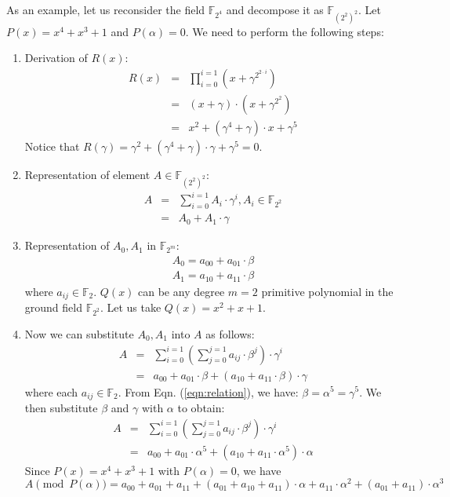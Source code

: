 \begin{Example}
As an example, let us reconsider the field $\mathbb{F}_{2^4}$ and decompose it
as $\mathbb{F}_{(2^2)^2}$. Let $P(x) = x^4 + x^3 + 1$ and $P(\alpha)=0$. We
need to perform the following steps:

\begin{enumerate}
\item 
Derivation of $R(x)$:
\begin{eqnarray}
R(x)&=&\prod_{i=0}^{i=1}(x+\gamma^{2^{2 \cdot i}}) \nonumber \\
&=&(x+\gamma)\cdot (x+\gamma^{2^2})               \nonumber \\
&=&x^2+(\gamma^4+\gamma) \cdot x+\gamma^5          
\end{eqnarray}
Notice that $R(\gamma) = \gamma^2 + (\gamma^4+\gamma) \cdot \gamma+\gamma^5 =0$.
\item 
Representation of element $A \in \mathbb{F}_{(2^2)^2}$:
\begin{eqnarray}
A& = & \sum_{i=0}^{i=1}A_i \cdot \gamma^i, A_i \in \mathbb{F}_{2^2}\nonumber \\
 & = & A_0 +A_1 \cdot \gamma
\end{eqnarray}
\item 
Representation of $A_0, A_1$ in $\mathbb{F}_{2^m}$:
\begin{eqnarray}
A_0=a_{00}+a_{01} \cdot \beta \nonumber \\
A_1=a_{10}+a_{11} \cdot \beta
\end{eqnarray}
where $a_{ij}\in \mathbb{F}_2$. $Q(x)$ can be any degree $m=2$ primitive
polynomial in the ground field  $\mathbb{F}_{2^2}$. Let us take $Q(x)=x^2+x+1$. 

\item Now we can substitute $A_0, A_1$ into $A$ as follows:
\begin{eqnarray}
A&=&\sum_{i=0}^{i=1}(\sum_{j=0}^{j=1}a_{ij} \cdot \beta^j) \cdot \gamma^i \nonumber \\
&=&a_{00}+a_{01}\cdot \beta+(a_{10}+a_{11}\cdot \beta)\cdot \gamma   \end{eqnarray}
where each $a_{ij} \in \mathbb{F}_2$. From Eqn. (\ref{eqn:relation}), we
have: $\beta=\alpha^5=\gamma^5$. We then substitute $\beta$ and
$\gamma$ with $\alpha$ to obtain:
\begin{eqnarray}
A&=&\sum_{i=0}^{i=1}(\sum_{j=0}^{j=1}a_{ij} \cdot \beta^j) \cdot \gamma^i \nonumber \\
&=&a_{00}+a_{01}\cdot \alpha^5+(a_{10}+a_{11}\cdot \alpha^5)\cdot \alpha \nonumber 
\end{eqnarray} 
Since $P(x)=x^4+x^3+1$ with $P(\alpha)=0$, we have
\begin{equation}\label{a}
A \pmod {P(\alpha)}=a_{00}+a_{01}+a_{11}+(a_{01}+a_{10}+a_{11})\cdot \alpha+a_{1
1} \cdot \alpha^2+(a_{01}+a_{11})\cdot \alpha^3   
\end{equation}


\end{enumerate}
\end{Example}
